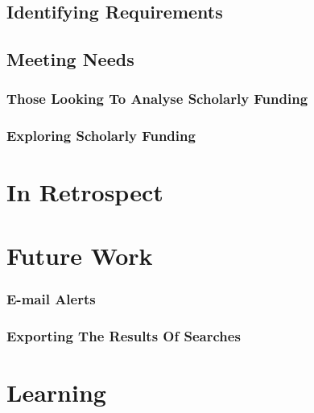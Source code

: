 \subsection{Identifying Requirements}
\subsection{Meeting Needs}
\subsubsection{Those Looking To Analyse Scholarly Funding}
\subsubsection{Exploring Scholarly Funding}
\section{In Retrospect}
\section{Future Work}
\subsubsection{E-mail Alerts}
\subsubsection{Exporting The Results Of Searches}
\section{Learning}
